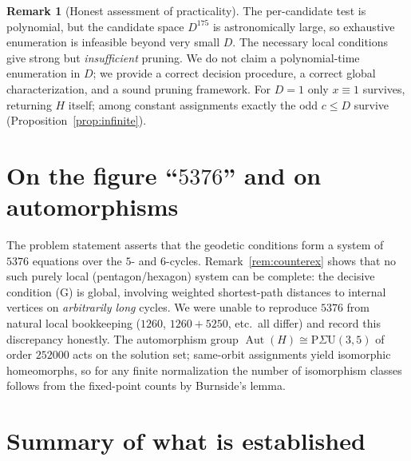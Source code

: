 \documentclass{amsart}
\theoremstyle{definition}
\newtheorem{remark}{Remark}
\begin{document}
\begin{remark}[Honest assessment of practicality]
The per-candidate test is polynomial, but the candidate space $D^{175}$ is
astronomically large, so exhaustive enumeration is infeasible beyond very small
$D$. The necessary local conditions give strong but \emph{insufficient} pruning.
We do not claim a polynomial-time enumeration in $D$; we provide a correct
decision procedure, a correct global characterization, and a sound pruning
framework. For $D=1$ only $x\equiv1$ survives, returning $H$ itself; among
constant assignments exactly the odd $c\le D$ survive
(Proposition~\ref{prop:infinite}).
\end{remark}

\section{On the figure ``$5376$'' and on automorphisms}

The problem statement asserts that the geodetic conditions form a system of
$5376$ equations over the $5$- and $6$-cycles. Remark~\ref{rem:counterex} shows
that no such purely local (pentagon/hexagon) system can be complete: the decisive
condition (G) is global, involving weighted shortest-path distances to internal
vertices on \emph{arbitrarily long} cycles. We were unable to reproduce $5376$
from natural local bookkeeping ($1260$, $1260+5250$, etc.\ all differ) and record
this discrepancy honestly. The automorphism group
$\operatorname{Aut}(H)\cong\mathrm P\Sigma\mathrm U(3,5)$ of order $252000$ acts
on the solution set; same-orbit assignments yield isomorphic homeomorphs, so for
any finite normalization the number of isomorphism classes follows from the
fixed-point counts by Burnside's lemma.

\section{Summary of what is established}
\end{document}
